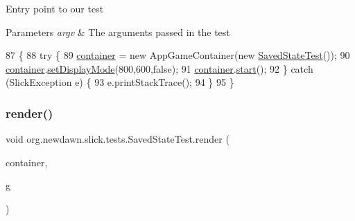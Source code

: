 Entry point to our test


\begin{DoxyParams}{Parameters}
{\em argv} & The arguments passed in the test \\
\hline
\end{DoxyParams}

\begin{DoxyCode}
87                                            \{
88         \textcolor{keywordflow}{try} \{
89             \mbox{\hyperlink{classorg_1_1newdawn_1_1slick_1_1tests_1_1_saved_state_test_ad6f5870be107273edb69949feace3400}{container}} = \textcolor{keyword}{new} AppGameContainer(\textcolor{keyword}{new} \mbox{\hyperlink{classorg_1_1newdawn_1_1slick_1_1tests_1_1_saved_state_test_ade9f1662a9e9aa0eb5813da099b66875}{SavedStateTest}}());
90             \mbox{\hyperlink{classorg_1_1newdawn_1_1slick_1_1tests_1_1_saved_state_test_ad6f5870be107273edb69949feace3400}{container}}.\mbox{\hyperlink{classorg_1_1newdawn_1_1slick_1_1_app_game_container_aa2de68db61ddd3917a8edc0177ebdfe3}{setDisplayMode}}(800,600,\textcolor{keyword}{false});
91             \mbox{\hyperlink{classorg_1_1newdawn_1_1slick_1_1tests_1_1_saved_state_test_ad6f5870be107273edb69949feace3400}{container}}.\mbox{\hyperlink{classorg_1_1newdawn_1_1slick_1_1_app_game_container_adcadc0e560e64d03be24c817931fdd54}{start}}();
92         \} \textcolor{keywordflow}{catch} (SlickException e) \{
93             e.printStackTrace();
94         \}
95     \}
\end{DoxyCode}
\mbox{\label{classorg_1_1newdawn_1_1slick_1_1tests_1_1_saved_state_test_ab3ea87bf5968c4558ddc3d884fd82bb1}} 
\subsubsection{\texorpdfstring{render()}{render()}}
{\footnotesize\ttfamily void org.\+newdawn.\+slick.\+tests.\+Saved\+State\+Test.\+render (\begin{DoxyParamCaption}\item[{\mbox{\hyperlink{classorg_1_1newdawn_1_1slick_1_1_game_container}{Game\+Container}}}]{container,  }\item[{\mbox{\hyperlink{classorg_1_1newdawn_1_1slick_1_1_graphics}{Graphics}}}]{g }\end{DoxyParamCaption})\hspace{0.3cm}{\ttfamily [inline]}}


